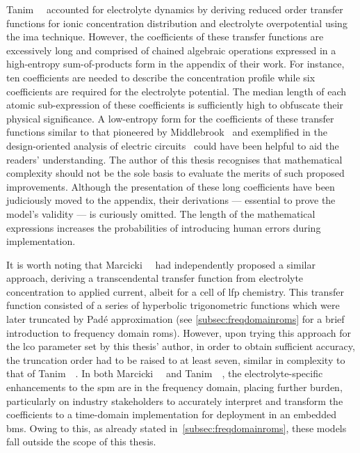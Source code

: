 Tanim~\etal~\cite{Tanim2014}  accounted  for  electrolyte dynamics  by  deriving
reduced   order  transfer   functions  for   ionic  concentration   distribution
and   electrolyte  overpotential   using  the   \gls{ima}  technique.   However,
the  coefficients  of   these  transfer  functions  are   excessively  long  and
comprised  of   chained  algebraic   operations  expressed  in   a  high-entropy
sum-of-products  form  in  the  appendix   of  their  work.  For  instance,  ten
coefficients  are  needed  to  describe  the  concentration  profile  while  six
coefficients  are required  for  the electrolyte  potential.  The median  length
of  each  atomic  sub-expression  of these  coefficients  is  sufficiently  high
to  obfuscate   their  physical  significance.   A  low-entropy  form   for  the
coefficients  of  these   transfer  functions  similar  to   that  pioneered  by
Middlebrook~\cite{Middlebrooka} and exemplified  in the design-oriented analysis
of  electric  circuits~\cite{Middlebrook1998a,Vorperian2002a}  could  have  been
helpful to aid the readers' understanding.  The author of this thesis recognises
that  mathematical complexity  should  not be  the sole  basis  to evaluate  the
merits of  such proposed improvements.  Although the presentation of  these long
coefficients have been judiciously moved  to the appendix, their derivations ---
essential to prove the model's validity  --- is curiously omitted. The length of
the mathematical  expressions increases  the probabilities of  introducing human
errors during implementation.

It  is worth  noting that  Marcicki~\etal~\cite{Marcicki2013} had  independently
proposed a similar approach, \viz{}  deriving a transcendental transfer function
from  electrolyte  concentration  to  applied  current, albeit  for  a  cell  of
\gls{lfp} chemistry. This transfer function  consisted of a series of hyperbolic
trigonometric functions which  were later truncated by  Padé approximation (see
\cref{subsec:freqdomainroms}  for  a  brief  introduction  to  frequency  domain
\glspl{rom}). However, upon trying this approach for the \gls{lco} parameter set
by this thesis'  author, in order to obtain sufficient  accuracy, the truncation
order had  to be  raised to  at least seven,  similar in  complexity to  that of
Tanim~\etal~\cite{Tanim2014a}.  In  both Marcicki~\etal~\cite{Marcicki2013}  and
Tanim~\etal~\cite{Tanim2014a},  the  electrolyte-specific  enhancements  to  the
\gls{spm} are in  the frequency domain, placing further  burden, particularly on
industry stakeholders to accurately interpret  and transform the coefficients to
a time-domain implementation  for deployment in an embedded  \gls{bms}. Owing to
this,  as  already  stated in~\cref{subsec:freqdomainroms},  these  models  fall
outside the scope of this thesis.






